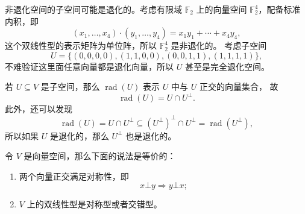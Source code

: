 \documentclass[fontset=none,zihao=-4]{Notes}
\DeclareMathOperator\rad{rad}
\begin{document}
\begin{example}
  非退化空间的子空间可能是退化的。考虑有限域 $\mathbb{F}_2$ 上的向量空间
  $\mathbb{F}_2^4$，配备标准内积，即
  \[
    (x_1,\dots,x_4)\cdot(y_1,\dots,y_4)=x_1y_1+\cdots+x_4y_4,  
  \]
  这个双线性型的表示矩阵为单位阵，所以 $\mathbb{F}_2^4$ 是非退化的。
  考虑子空间
  \[
    U=\{(0,0,0,0),(1,1,0,0),(0,0,1,1),(1,1,1,1)\},  
  \]
  不难验证这里面任意向量都是退化向量，所以 $U$ 甚至是完全退化空间。
\end{example}

若 $U\subseteq V$ 是子空间，那么 $\rad(U)$ 表示 $U$ 中与 $U$ 正交的向量集合，
故
\[
  \rad(U)=U\cap U^\bot.  
\]
此外，还可以发现
\[
  \rad(U)=U\cap U^\bot\subseteq (U^\bot)^\bot\cap U^\bot=\rad(U^\bot),  
\]
所以如果 $U$ 是退化的，那么 $U^\bot$ 也是退化的。

\begin{theorem}
  令 $V$ 是向量空间，那么下面的说法是等价的：
  \begin{enumerate}
    \item 两个向量正交满足对称性，即 
    \[
      x\bot y\Rightarrow y\bot x;  
    \]
    \item $V$ 上的双线性型是对称型或者交错型。
  \end{enumerate}
\end{theorem}
\end{document}
